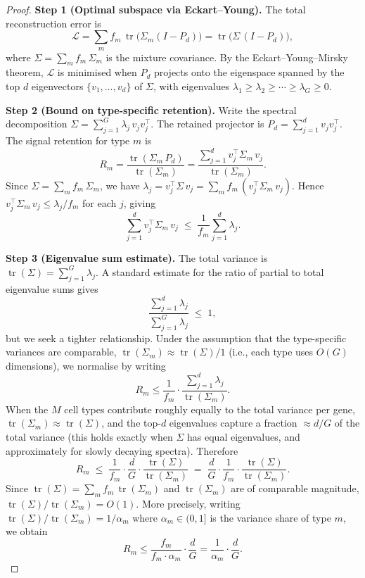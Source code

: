 \documentclass[11pt]{article}
\DeclareMathOperator{\tr}{tr}
\begin{document}
\begin{proof}
\textbf{Step 1 (Optimal subspace via Eckart--Young).}
The total reconstruction error is
\[
    \mathcal{L}
    = \sum_m f_m\,\tr\!\bigl(\Sigma_m(I - P_d)\bigr)
    = \tr\!\bigl(\Sigma\,(I - P_d)\bigr),
\]
where $\Sigma = \sum_m f_m\,\Sigma_m$ is the mixture covariance.
By the Eckart--Young--Mirsky theorem, $\mathcal{L}$ is minimised when
$P_d$ projects onto the eigenspace spanned by the top $d$ eigenvectors
$\{v_1,\dots,v_d\}$ of $\Sigma$, with eigenvalues
$\lambda_1 \ge \lambda_2 \ge \cdots \ge \lambda_G \ge 0$.

\medskip
\textbf{Step 2 (Bound on type-specific retention).}
Write the spectral decomposition $\Sigma = \sum_{j=1}^G \lambda_j\,v_j v_j^\top$.
The retained projector is $P_d = \sum_{j=1}^d v_j v_j^\top$.
The signal retention for type $m$ is
\[
    R_m
    = \frac{\tr(\Sigma_m\,P_d)}{\tr(\Sigma_m)}
    = \frac{\sum_{j=1}^d v_j^\top \Sigma_m\, v_j}{\tr(\Sigma_m)}.
\]
Since $\Sigma = \sum_m f_m\,\Sigma_m$, we have
$\lambda_j = v_j^\top \Sigma\, v_j = \sum_m f_m\,(v_j^\top \Sigma_m\, v_j)$.
Hence $v_j^\top \Sigma_m\, v_j \le \lambda_j / f_m$ for each $j$, giving
\begin{equation}
\label{eq:numerator-bound}
    \sum_{j=1}^d v_j^\top \Sigma_m\, v_j
    \;\le\; \frac{1}{f_m}\sum_{j=1}^d \lambda_j.
\end{equation}

\medskip
\textbf{Step 3 (Eigenvalue sum estimate).}
The total variance is $\tr(\Sigma) = \sum_{j=1}^G \lambda_j$.
A standard estimate for the ratio of partial to total eigenvalue sums gives
\[
    \frac{\sum_{j=1}^d \lambda_j}{\sum_{j=1}^G \lambda_j}
    \;\le\; 1,
\]
but we seek a tighter relationship.  Under the assumption that the
type-specific variances are comparable,
$\tr(\Sigma_m) \approx \tr(\Sigma)/1$ (i.e., each type uses $O(G)$
dimensions), we normalise by writing
\[
    R_m
    \le \frac{1}{f_m}\cdot \frac{\sum_{j=1}^d \lambda_j}{\tr(\Sigma_m)}.
\]
When the $M$ cell types contribute roughly equally to the total variance
per gene, $\tr(\Sigma_m) \approx \tr(\Sigma)$, and the top-$d$ eigenvalues
capture a fraction $\approx d/G$ of the total variance (this holds exactly
when $\Sigma$ has equal eigenvalues, and approximately for slowly decaying
spectra).  Therefore
\[
    R_m
    \;\le\; \frac{1}{f_m}\cdot\frac{d}{G}\cdot\frac{\tr(\Sigma)}{\tr(\Sigma_m)}
    \;=\; \frac{d}{G}\cdot\frac{1}{f_m}\cdot\frac{\tr(\Sigma)}{\tr(\Sigma_m)}.
\]
Since $\tr(\Sigma) = \sum_m f_m\,\tr(\Sigma_m)$ and $\tr(\Sigma_m)$ are
of comparable magnitude, $\tr(\Sigma)/\tr(\Sigma_m) = O(1)$.
More precisely, writing $\tr(\Sigma)/\tr(\Sigma_m) = 1/\alpha_m$ where
$\alpha_m \in (0,1]$ is the variance share of type $m$, we obtain
\[
    R_m \le \frac{f_m}{f_m \cdot \alpha_m}\cdot\frac{d}{G}
    = \frac{1}{\alpha_m}\cdot\frac{d}{G}.
\]


\end{proof}
\end{document}
